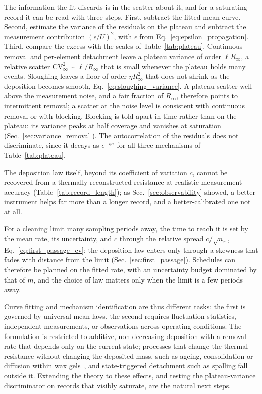 \documentclass[preprint,12pt]{elsarticle}
\begin{document}
The information the fit discards is in the scatter about it, and for a
saturating record it can be read with three steps. First, subtract the
fitted mean curve. Second, estimate the variance of the residuals on the
plateau and subtract the measurement contribution $(\epsilon/U)^2$, with
$\epsilon$ from Eq.~\eqref{eq:epsilon_propagation}. Third, compare the excess
with the scales of Table~\ref{tab:plateau}. Continuous removal and
per-element detachment leave a plateau variance of order $\ell R_\infty$,
a relative scatter $\mathrm{CV}_\infty^2\sim\ell/R_\infty$ that is small
whenever the plateau holds many events. Sloughing leaves a floor of order
$\eta R_\infty^2$ that does not shrink as the deposition becomes smooth,
Eq.~\eqref{eq:sloughing_variance}. A plateau scatter well above the
measurement noise, and a fair fraction of $R_\infty$, therefore points to
intermittent removal; a scatter at the noise level is consistent with
continuous removal or with blocking. Blocking is told apart in time rather
than on the plateau: its variance peaks at half coverage and vanishes at
saturation (Sec.~\ref{sec:variance_removal}). The autocorrelation of the
residuals does not discriminate, since it decays as $e^{-\psi\tau}$ for all
three mechanisms of Table~\ref{tab:plateau}.

The deposition law itself, beyond its coefficient of variation $c$, cannot be
recovered from a thermally reconstructed resistance at realistic
measurement accuracy (Table~\ref{tab:record_length}); as
Sec.~\ref{sec:observability} showed, a better instrument helps far more
than a longer record, and a better-calibrated one not at all.

For a cleaning limit many sampling periods away, the time to reach it is set
by the mean rate, its uncertainty, and $c$ through the relative spread
$c/\sqrt{n_x}$, Eq.~\eqref{eq:first_passage_cv}; the deposition law enters
only through a skewness that fades with distance from the limit
(Sec.~\ref{sec:first_passage}). Schedules can therefore be planned on the
fitted rate, with an uncertainty budget dominated by that of $m$, and the
choice of law matters only when the limit is a few periods away.

Curve fitting and mechanism identification are thus different tasks: the
first is governed by universal mean laws, the second requires fluctuation
statistics, independent measurements, or observations across operating
conditions. The formulation is restricted to additive, non-decreasing
deposition with a removal rate that depends only on the current state;
processes that change the thermal resistance without changing the deposited
mass, such as ageing, consolidation or diffusion within wax
gels~\cite{Singh2000,Mehrotra2021}, and state-triggered detachment such as
spalling fall outside it. Extending the theory to these effects, and testing
the plateau-variance discriminator on records that visibly saturate, are the
natural next steps.
\end{document}

